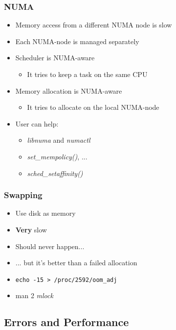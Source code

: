 \begin{frame}
  \frametitle{NUMA}

  \begin{itemize}
  \item Memory access from a different NUMA node is slow
  \item Each NUMA-node is managed separately
  \item Scheduler is NUMA-aware
    \begin{itemize}
    \item It tries to keep a task on the same CPU
    \end{itemize}
  \item Memory allocation is NUMA-aware
    \begin{itemize}
    \item It tries to allocate on the local NUMA-node
    \end{itemize}
  \item User can help:
    \begin{itemize}
    \item \emph{libnuma} and \emph{numactl}
    \item \emph{set\_mempolicy()}, ...
    \item \emph{sched\_setaffinity()}
    \end{itemize}
  \end{itemize}
\end{frame}


\begin{frame}[fragile]
  \frametitle{Swapping}

  \begin{itemize}
  \item Use disk as memory
  \item \textbf{Very} slow
  \item Should never happen...
  \item ... but it's better than a failed allocation
  \item \verb+echo -15 > /proc/2592/oom_adj+
  \item man 2 \emph{mlock}
  \end{itemize}
\end{frame}


\subsection{Errors and Performance}
\label{subsec:perf}

